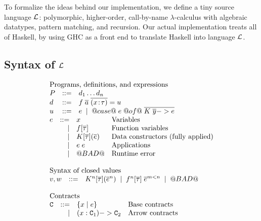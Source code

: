 To formalize the ideas behind our implementation, we define a
tiny source language $\cal L$:
polymorphic, higher-order, call-by-name $\lambda$-calculus with
algebraic datatypes, pattern matching, and recursion.  
Our actual implementation treats all of Haskell, by using GHC as a front 
end to translate Haskell into language $\cal L$.

\subsection{Syntax of $\cal L$} \label{s:syntax}

\begin{figure}
\[\begin{array}{l} 
\begin{array}{lrll}
\multicolumn{3}{l}{\text{Programs, definitions, and expressions}} \\
P   & ::= & d_1 \ldots d_n \\
d   & ::= & f\; \ol{a} \; \ol{(x\!:\!\tau)} = u \\
u   & ::= & e \; \mid \; @case@\;e\;@of@\;\ol{K\;\ol{y} -> e}
\end{array}
\\ 
\begin{array}{lrll}
e  & ::=  & x            & \text{Variables} \\ 
   & \mid & f[\ol{\tau}] & \text{Function variables} \\ 
   & \mid & K[\ol{\tau}](\ol{e}) & \text{Data constructors (fully applied)} \\
   & \mid & e\;e         & \text{Applications} \\
   & \mid & @BAD@        & \text{Runtime error} \\ 
\end{array}\\ \\ 
\begin{array}{lrll}
\multicolumn{3}{l}{\text{Syntax of closed values}} \\
 v,w & ::= & K^\ar[\ol{\tau}](\oln{e}{\ar}) \;\mid\; f^\ar[\ol{\tau}]\;\oln{e}{m < \ar} \;\mid\; @BAD@ \\ \\ 
\end{array}
\\ 
\begin{array}{lrll}
\multicolumn{3}{l}{\text{Contracts}} \\
 \Ct & ::=  & \{ x \mid e \}        & \text{Base contracts}  \\ 
     & \mid &  (x : \Ct_1) -> \Ct_2      & \text{Arrow contracts} \\ 

\end{array}
\end{array}\]
\end{figure}
